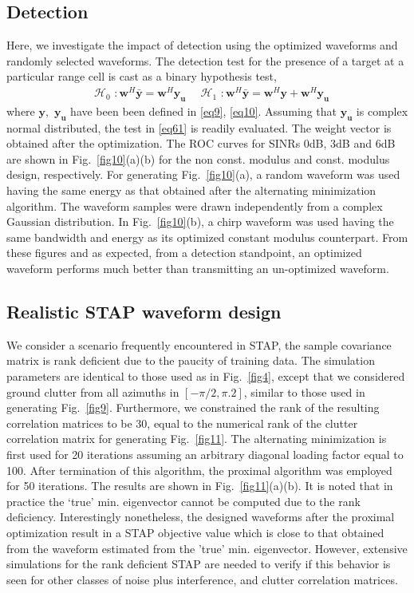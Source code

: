 \documentclass[11pt,draftclsnofoot,onecolumn]{IEEEtran}
\theoremstyle{definition}
\theoremstyle{remark}
\begin{document}
\subsection{Detection}
Here, we investigate the impact of detection using the optimized waveforms and randomly selected waveforms. The detection test for the presence of a target at a particular range cell is cast as a binary hypothesis test,
\begin{equation}\label{eq61}
\begin{aligned}
&\mathcal{H}_0 \,\, : \mathbf{w}^H\bar{\mathbf{y}}=\mathbf{w}^H\mathbf{y_u} \,\,\,
&\mathcal{H}_1\,\, : \mathbf{w}^H\bar{\mathbf{y}}=\mathbf{w}^H\mathbf{y}+\mathbf{w}^H\mathbf{y_u}
\end{aligned}
\end{equation}
where $\mathbf{y},$ $\mathbf{y_u}$ have been been defined in \eqref{eq9}, \eqref{eq10}. Assuming that $\mathbf{y_u}$ is complex normal distributed, the test in \eqref{eq61} is readily evaluated. The weight vector is obtained after the optimization. The ROC curves for SINRs 0dB, 3dB and 6dB are shown in Fig.~\ref{fig10}(a)(b) for the non const. modulus and const. modulus design, respectively. For generating Fig.~\ref{fig10}(a),  a random waveform was used having the same energy as that obtained after the alternating minimization algorithm. The waveform samples were drawn independently from a complex Gaussian distribution. In Fig.~\ref{fig10}(b), a chirp waveform was used having the same bandwidth and energy as its optimized constant modulus counterpart. From these figures and as expected, from a  detection standpoint, an optimized waveform performs much better than transmitting an un-optimized waveform. 
\subsection{Realistic STAP waveform design}
We consider  a scenario frequently encountered in STAP, the sample covariance matrix is rank deficient due to the paucity of training data. The simulation parameters are identical to those used as in Fig.~\ref{fig4}, except that we considered ground clutter from all azimuths in $[-\pi/2,\pi.2]$, similar to those used in generating Fig.~\ref{fig9}. Furthermore, we constrained the rank of the resulting correlation matrices to be 30, equal to the numerical rank of the clutter correlation matrix for generating Fig.~\ref{fig11}. The alternating minimization is first used for 20 iterations assuming an arbitrary diagonal loading factor equal to 100. After termination of this algorithm, the proximal algorithm was employed for 50 iterations. The results are shown in Fig.~\ref{fig11}(a)(b). It is noted that in practice the `true' min. eigenvector cannot be computed due to the rank deficiency. Interestingly nonetheless, the designed waveforms after the proximal optimization result in a STAP objective value which is close to that obtained from the waveform estimated from the 'true' min. eigenvector. However, extensive simulations for the rank deficient STAP are needed to verify if this behavior is seen for other classes of noise plus interference, and clutter correlation matrices. 
\end{document}
